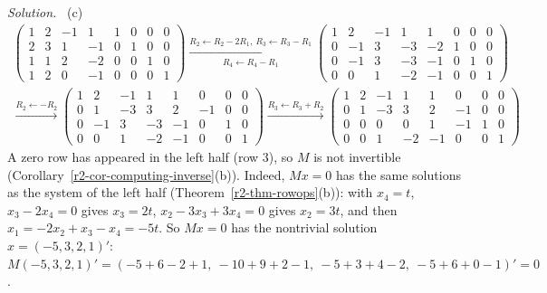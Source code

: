 \documentclass[12pt]{article}
\theoremstyle{definition}
\newenvironment{solution}{\par\noindent\textit{Solution.}\ }{\par\smallskip}
\begin{document}
\begin{solution}
(c)
\[
\begin{gathered}
\left(\begin{array}{cccc|cccc}1&2&-1&1&1&0&0&0\\2&3&1&-1&0&1&0&0\\1&1&2&-2&0&0&1&0\\1&2&0&-1&0&0&0&1\end{array}\right)
\xrightarrow[R_4\leftarrow R_4-R_1]{R_2\leftarrow R_2-2R_1,\ R_3\leftarrow R_3-R_1}
\left(\begin{array}{cccc|cccc}1&2&-1&1&1&0&0&0\\0&-1&3&-3&-2&1&0&0\\0&-1&3&-3&-1&0&1&0\\0&0&1&-2&-1&0&0&1\end{array}\right)
\\
\xrightarrow{R_2\leftarrow-R_2}
\left(\begin{array}{cccc|cccc}1&2&-1&1&1&0&0&0\\0&1&-3&3&2&-1&0&0\\0&-1&3&-3&-1&0&1&0\\0&0&1&-2&-1&0&0&1\end{array}\right)
\xrightarrow{R_3\leftarrow R_3+R_2}
\left(\begin{array}{cccc|cccc}1&2&-1&1&1&0&0&0\\0&1&-3&3&2&-1&0&0\\0&0&0&0&1&-1&1&0\\0&0&1&-2&-1&0&0&1\end{array}\right)
\end{gathered}
\]
A zero row has appeared in the left half (row \(3\)), so \(M\) is not invertible
(Corollary~\ref{r2-cor-computing-inverse}(b)). Indeed, \(Mx=0\) has the same solutions as the system of the left half
(Theorem~\ref{r2-thm-rowops}(b)): with \(x_4=t\), \(x_3-2x_4=0\) gives \(x_3=2t\), \(x_2-3x_3+3x_4=0\) gives
\(x_2=3t\), and then \(x_1=-2x_2+x_3-x_4=-5t\). So \(Mx=0\) has the nontrivial solution \(x=(-5,3,2,1)'\):
\(M(-5,3,2,1)'=(-5+6-2+1,\ -10+9+2-1,\ -5+3+4-2,\ -5+6+0-1)'=0\).
\end{solution}
\end{document}
